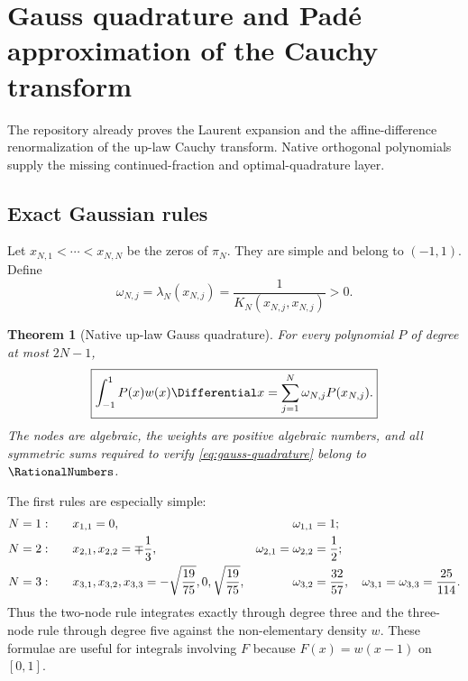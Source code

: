 \documentclass[11pt,oneside]{article}
\newtheorem{theorem}{Theorem}[section]
\theoremstyle{definition}
\theoremstyle{remark}
\numberwithin{equation}{section}
\begin{document}
\section{Gauss quadrature and Pad\'e approximation of the Cauchy transform}
\label{sec:gauss-pade}

The repository already proves the Laurent expansion and the affine-difference
renormalization of the up-law Cauchy transform.  Native orthogonal polynomials
supply the missing continued-fraction and optimal-quadrature layer.

\subsection{Exact Gaussian rules}
Let $x_{N,1}<\cdots<x_{N,N}$ be the zeros of $\pi_N$.  They are simple and
belong to $(-1,1)$.  Define
\begin{equation}
 \omega_{N,j}=\lambda_N(x_{N,j})
 =\frac1{K_N(x_{N,j},x_{N,j})}>0.
 \label{eq:gauss-weights}
\end{equation}

\begin{theorem}[Native up-law Gauss quadrature]
\label{thm:gauss-quadrature}
For every polynomial $P$ of degree at most $2N-1$,
\begin{equation}
 \boxed{
 \int_{-1}^{1}P(x)w(x)\Differential x
 =\sum_{j=1}^{N}\omega_{N,j}P(x_{N,j}).}
 \label{eq:gauss-quadrature}
\end{equation}
The nodes are algebraic, the weights are positive algebraic numbers, and all
symmetric sums required to verify \cref{eq:gauss-quadrature} belong to $\RationalNumbers$.
\end{theorem}

The first rules are especially simple:
\begin{align}
 N=1:&\qquad x_{1,1}=0,
  & \omega_{1,1}&=1;\notag\\
 N=2:&\qquad x_{2,1},x_{2,2}=\mp\frac13,
  & \omega_{2,1}=\omega_{2,2}&=\frac12;\label{eq:gauss-two}\\
 N=3:&\qquad x_{3,1},x_{3,2},x_{3,3}
   =-\sqrt{\frac{19}{75}},0,\sqrt{\frac{19}{75}},
  & \omega_{3,2}&=\frac{32}{57},\quad
    \omega_{3,1}=\omega_{3,3}=\frac{25}{114}.
 \label{eq:gauss-three}
\end{align}
Thus the two-node rule integrates exactly through degree three and the
three-node rule through degree five against the non-elementary density $w$.
These formulae are useful for integrals involving $F$ because
$F(x)=w(x-1)$ on $[0,1]$.
\end{document}
